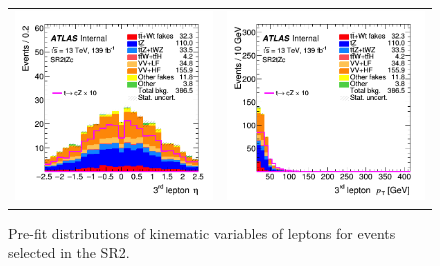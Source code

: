 \begin{figure}[!htbp]
\begin{tabular}{cc}
		\includegraphics[width=.35\textwidth]{Appendices/AP6/figures/SR2/lep3_eta} &
		\includegraphics[width=.35\textwidth]{Appendices/AP6/figures/SR2/lep3_pt} \\
	\end{tabular}
	\caption{Pre-fit distributions of kinematic variables of leptons for events selected in the SR2\tZc.
		\ErrStatOnly
		\Blinded
	}%
	\label{fig:sel:sr2:leps}
\end{figure}

